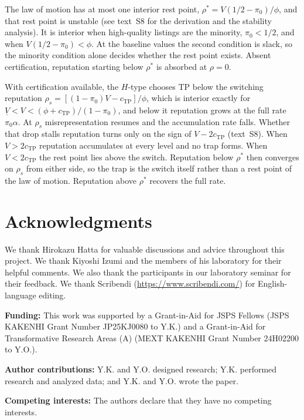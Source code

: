\documentclass[11pt,letterpaper]{article}
\theoremstyle{definition}
\begin{document}
The law of motion has at most one interior rest point, $\rho^{*} = V(1/2 - \pi_0)/\phi$, and that rest point is unstable (see text~S8 for the derivation and the stability analysis). It is interior when high-quality listings are the minority, $\pi_0 < 1/2$, and when $V(1/2 - \pi_0) < \phi$. At the baseline values the second condition is slack, so the minority condition alone decides whether the rest point exists. Absent certification, reputation starting below $\rho^{*}$ is absorbed at $\rho = 0$.

With certification available, the $H$-type chooses TP below the switching reputation $\rho_s = [(1 - \pi_0)V - c_{\text{TP}}]/\phi$, which is interior exactly for $\underline{V} < V < (\phi + c_{\text{TP}})/(1 - \pi_0)$, and below it reputation grows at the full rate $\pi_0\alpha$. At $\rho_s$ misrepresentation resumes and the accumulation rate falls. Whether that drop stalls reputation turns only on the sign of $V - 2c_{\text{TP}}$ (text~S8). When $V > 2c_{\text{TP}}$ reputation accumulates at every level and no trap forms. When $V < 2c_{\text{TP}}$ the rest point lies above the switch. Reputation below $\rho^{*}$ then converges on $\rho_s$ from either side, so the trap is the switch itself rather than a rest point of the law of motion. Reputation above $\rho^{*}$ recovers the full rate.

\endgroup




\section*{Acknowledgments}
We thank Hirokazu Hatta for valuable discussions and advice throughout this project. We thank Kiyoshi Izumi and the members of his laboratory for their helpful comments. We also thank the participants in our laboratory seminar for their feedback. We thank Scribendi (\url{https://www.scribendi.com/}) for English-language editing.

\noindent\textbf{Funding:} This work was supported by a Grant-in-Aid for JSPS Fellows (JSPS KAKENHI Grant Number JP25KJ0080 to Y.K.) and a Grant-in-Aid for Transformative Research Areas (A) (MEXT KAKENHI Grant Number 24H02200 to Y.O.).

\noindent\textbf{Author contributions:} Y.K. and Y.O. designed research; Y.K. performed research and analyzed data; and Y.K. and Y.O. wrote the paper.

\noindent\textbf{Competing interests:} The authors declare that they have no competing interests.
\end{document}
